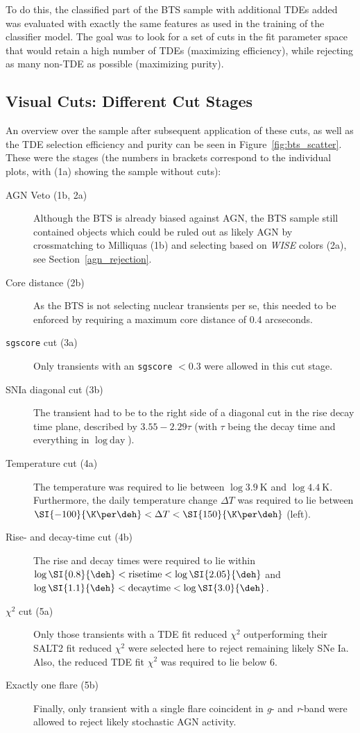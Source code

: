 To do this, the classified part of the BTS sample with additional TDEs added was evaluated with exactly the same features as used in the training of the classifier model. The goal was to look for a set of cuts in the fit parameter space that would retain a high number of TDEs (maximizing efficiency), while rejecting as many non-TDE as possible (maximizing purity).

\subsection{Visual Cuts: Different Cut Stages}
An overview over the sample after subsequent application of these cuts, as well as the TDE selection efficiency and purity can be seen in Figure~\ref{fig:bts_scatter}. These were the stages (the numbers in brackets correspond to the individual plots, with (1a) showing the sample without cuts):

\begin{description}
  \item[AGN Veto (1b, 2a)] Although the BTS is already biased against AGN, the BTS sample still contained objects which could be ruled out as likely AGN by crossmatching to Milliquas (1b) and selecting based on \textit{WISE} colors (2a), see Section~\ref{agn_rejection}.
  \item[Core distance (2b)] As the BTS is not selecting nuclear transients per se, this needed to be enforced by requiring a maximum core distance of 0.4 arcseconds.
  \item[\texttt{sgscore} cut (3a)] Only transients with an \texttt{sgscore} $<0.3$ were allowed in this cut stage.
  \item[SNIa diagonal cut (3b)] The transient had to be to the right side of a diagonal cut in the rise decay time plane, described by $3.55 - 2.29 \tau$ (with $\tau$ being the decay time and everything in $\log~\text{day}$).
  \item[Temperature cut (4a)] The temperature was required to lie between $\log \SI{3.9}{\K}$ and $\log\SI{4.4}{\K}$. Furthermore, the daily temperature change $\Delta T$ was required to lie between $\SI{-100}{\K\per\deh} < \Delta T < \SI{150}{\K\per\deh}$ (left).
  \item[Rise- and decay-time cut (4b)] The rise and decay times were required to lie within $\log \SI{0.8}{\deh} < \text{risetime} < \log \SI{2.05}{\deh}$ and $\log \SI{1.1}{\deh} < \text{decaytime} < \log \SI{3.0}{\deh}$.
  \item[$\chi^2$ cut (5a)] Only those transients with a TDE fit reduced $\chi^2$ outperforming their SALT2 fit reduced $\chi^2$ were selected here to reject remaining likely SNe Ia. Also, the reduced TDE fit $\chi^2$ was required to lie below 6.
  \item[Exactly one flare (5b)] Finally, only transient with a single flare coincident in \textit{g}- and \textit{r}-band were allowed to reject likely stochastic AGN activity.
\end{description}

